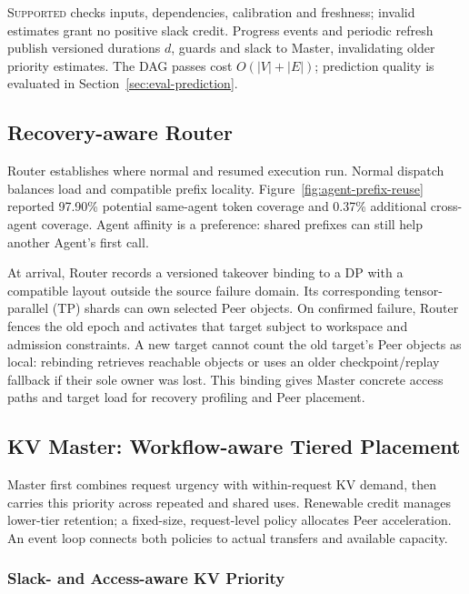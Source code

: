 \textsc{Supported} checks inputs, dependencies, calibration and freshness;
invalid estimates grant no positive slack credit. Progress events and
periodic refresh publish versioned durations $d$, guards and slack to
Master, invalidating older priority estimates. The DAG passes cost
$O(|V|+|E|)$; prediction quality is evaluated in
Section~\ref{sec:eval-prediction}.

\subsection{Recovery-aware Router}
\label{sec:recovery-router}

Router establishes where normal and resumed execution run. Normal
dispatch balances load and compatible prefix locality.
Figure~\ref{fig:agent-prefix-reuse} reported 97.90\% potential same-agent
token coverage and 0.37\% additional cross-agent coverage. Agent affinity
is a preference: shared prefixes can still help another Agent's first call.

At arrival, Router records a versioned takeover binding to a DP with a
compatible layout outside the source failure domain. Its corresponding
tensor-parallel (TP) shards can own selected Peer objects. On confirmed
failure, Router fences the old epoch and activates that target subject
to workspace and admission constraints. A new target cannot count the
old target's Peer objects as local: rebinding retrieves reachable objects
or uses an older checkpoint/replay fallback if their sole owner was lost.
This binding gives Master concrete access paths and target load for
recovery profiling and Peer placement.

\subsection{KV Master: Workflow-aware Tiered Placement}
\label{sec:kv-master}

Master first combines request urgency with within-request KV demand,
then carries this priority across repeated and shared uses. Renewable
credit manages lower-tier retention; a fixed-size, request-level policy
allocates Peer acceleration. An event loop connects both policies to
actual transfers and available capacity.

\subsubsection{Slack- and Access-aware KV Priority}
\label{sec:placement-value}
\label{sec:prefix-value}

